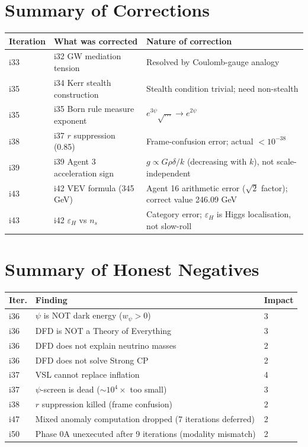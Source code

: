 \documentclass[11pt,a4paper]{article}
\begin{document}
\section{Summary of Corrections}
\label{sec:corrections}

\begin{longtable}{llp{7cm}}
\toprule
\textbf{Iteration} & \textbf{What was corrected} & \textbf{Nature of correction} \\
\midrule
\endfirsthead
i33 & i32 GW mediation tension & Resolved by Coulomb-gauge analogy \\
i35 & i34 Kerr stealth construction & Stealth condition trivial; need non-stealth \\
i35 & i35 Born rule measure exponent & $e^{3\psi}\sqrt{\ldots} \to e^{2\psi}$ \\
i38 & i37 $r$ suppression (0.85) & Frame-confusion error; actual $< 10^{-38}$ \\
i39 & i39 Agent 3 acceleration sign & $g \propto G\rho\delta/k$ (decreasing with $k$), not scale-independent \\
i43 & i42 VEV formula (345 GeV) & Agent 16 arithmetic error ($\sqrt{2}$ factor); correct value 246.09 GeV \\
i43 & i42 $\varepsilon_H$ vs $n_s$ & Category error; $\varepsilon_H$ is Higgs localisation, not slow-roll \\
\bottomrule
\end{longtable}

\section{Summary of Honest Negatives}
\label{sec:negatives}

\begin{longtable}{lp{8cm}l}
\toprule
\textbf{Iter.} & \textbf{Finding} & \textbf{Impact} \\
\midrule
\endfirsthead
i36 & $\psi$ is NOT dark energy ($w_\psi > 0$) & 3 \\
i36 & DFD is NOT a Theory of Everything & 3 \\
i36 & DFD does not explain neutrino masses & 2 \\
i36 & DFD does not solve Strong CP & 2 \\
i37 & VSL cannot replace inflation & 4 \\
i37 & $\psi$-screen is dead ($\sim 10^4\times$ too small) & 3 \\
i38 & $r$ suppression killed (frame confusion) & 2 \\
i47 & Mixed anomaly computation dropped (7 iterations deferred) & 2 \\
i50 & Phase 0A unexecuted after 9 iterations (modality mismatch) & 2 \\
\bottomrule
\end{longtable}
\end{document}
